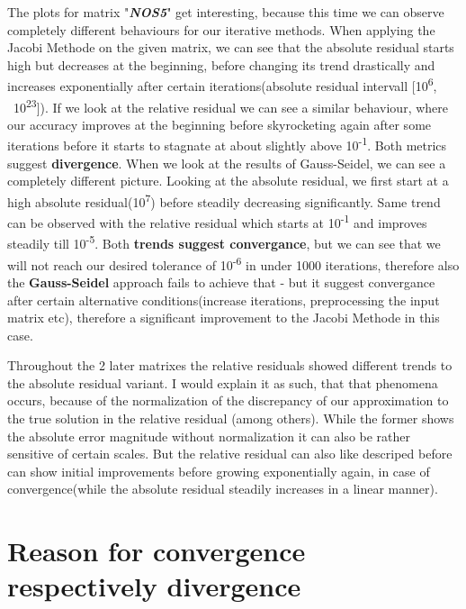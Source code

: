 \documentclass{article}
\begin{document}
    The plots for matrix "\textbf{\textit{NOS5}}" get interesting, because this time we can observe completely different behaviours for our iterative methods. When applying the Jacobi Methode on the given matrix, we can see that the absolute residual starts high but decreases at the beginning, before changing its trend drastically and increases exponentially after certain iterations(absolute residual intervall [10\textsuperscript{6}, ~10\textsuperscript{23}]). If we look at the relative residual we can see a similar behaviour, where our accuracy improves at the beginning before skyrocketing again after some iterations before it starts to stagnate at about slightly above  10\textsuperscript{-1}. Both metrics suggest \textbf{divergence}.
    When we look at the results of Gauss-Seidel, we can see a completely different picture. Looking at the absolute residual, we first start at a high absolute residual(10\textsuperscript{7}) before steadily decreasing significantly. Same trend can be observed with the relative residual which starts at 10\textsuperscript{-1} and improves steadily till 10\textsuperscript{-5}. Both \textbf{trends suggest convergance}, but we can see that we will not reach our desired tolerance of 10\textsuperscript{-6} in under 1000 iterations, therefore also the \textbf{Gauss-Seidel} approach fails to achieve that - but it suggest convergance after certain alternative conditions(increase iterations, preprocessing the input matrix etc), therefore a significant improvement to the Jacobi Methode in this case.
    
    Throughout the 2 later matrixes the relative residuals showed different trends to the absolute residual variant. I would explain it as such, that that phenomena occurs, because of the normalization of the discrepancy of our approximation to the true solution in the relative residual (among others). While the former shows the absolute error magnitude without normalization it can also be rather sensitive of certain scales. But the relative residual can also like descriped before can show initial improvements before growing exponentially again, in case of convergence(while the absolute residual steadily increases in a linear manner).
    
\section*{Reason for convergence respectively divergence}
\end{document}
